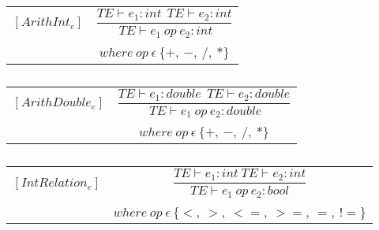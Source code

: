 \begin{table}[H]
    \begin{center}
    \begin{longtable}[c] { r c }
        $[ArithInt_{e}]$ 
        & 
        \( \dfrac{TE \vdash e_{1} :  int \ \ TE \vdash e_{2} : int} 
        {\ TE \vdash e_{1} \ op \ e_{2} : int} \) 
        \\ \\
        & 
        \( {where \ op \ \epsilon \ \{+, \ -, \ /, \ *\} } \)
    \end{longtable}
    \caption{}\label{s-empty}
        \end{center}
\end{table}
\begin{table}[H]
    \begin{center}
    \begin{longtable}[c] { r c }
        $[ArithDouble_{e}]$ 
        & 
        \( \dfrac{TE \vdash e_{1} : double \ \ TE \vdash e_{2} :  double} 
        {\ TE \vdash e_{1} \ op \ e_{2} : double} \) 
        \\ \\
        & 
        \( {where \ op \ \epsilon \ \{+, \ -, \ /, \ *\} } \)
    \end{longtable}
    \caption{}\label{s-empty}
        \end{center}
\end{table}
\begin{table}[H]
    \begin{center}
    \begin{longtable}[c] { r c }
        $[IntRelation_{e}]$ 
        & 
        \( \dfrac{T E  \vdash  e_1  :  int \ T E  \vdash  e_2  :  int}{T E  \vdash  e_1 \ op \ e_2  :  bool} \) 
        \\ \\
        & 
        \( {where \ op \ \epsilon \ \{<,\ >,\ <=,\ >=,\ =,\ !=\}} \)
    \end{longtable}
    \caption{}\label{s-empty}
        \end{center}
\end{table}

